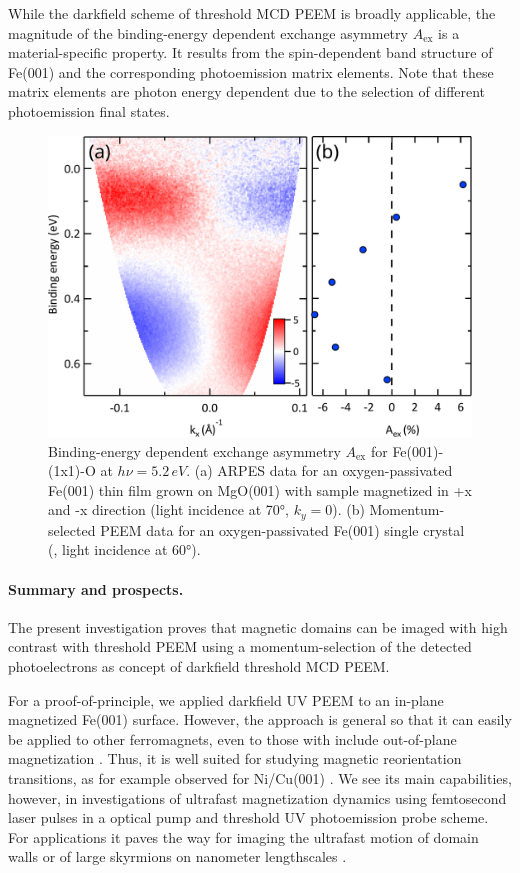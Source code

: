 \documentclass[prl,twocolumn,floatfix]{revtex4-2}
\newcommand{\rework}[1]{{\color{blue}{#1}}}
\begin{document}
While the darkfield scheme of threshold MCD PEEM is broadly applicable, the magnitude of the binding-energy dependent exchange asymmetry $A_{\mathrm{ex}}$ is a material-specific property. It results from the spin-dependent band structure of Fe(001) and the corresponding photoemission matrix elements. Note that these matrix elements are photon energy dependent due to the selection of different photoemission final states.

\begin{figure}
    \centering
    \includegraphics[width = 0.9\columnwidth]{Fe001-O_2.pdf}
    \caption{Binding-energy dependent exchange asymmetry $A_{\mathrm{ex}}$ for Fe(001)-(1x1)-O at $h\nu = 5.2\,eV$. (a) ARPES data for an oxygen-passivated Fe(001) thin film grown on MgO(001) with sample magnetized in +x and -x direction (light incidence at 70°, $k_y = 0$). (b) Momentum-selected PEEM data for an oxygen-passivated Fe(001) single crystal (\rework{selection at $k_x = \unit[xx]{\AA}$, $k_y = 0$}, light incidence at 60°). 
    }
    \label{fig:AexContrast}
\end{figure}

\paragraph{Summary and prospects.} The present investigation proves that magnetic domains can be imaged with high contrast with threshold PEEM using a momentum-selection of the detected photoelectrons as concept of darkfield threshold MCD PEEM. 

For a proof-of-principle, we applied darkfield UV PEEM to an in-plane magnetized Fe(001) surface. However, the approach is general so that it can easily be applied to other ferromagnets, even to those with include out-of-plane magnetization \cite{kronseder2011}. Thus, it is well suited for studying magnetic reorientation transitions, as for example observed for Ni/Cu(001) \cite{fukumoto2002,sander2004,nakagawa2006,kronseder2011}. We see its main capabilities, however, in investigations of ultrafast magnetization dynamics using femtosecond laser pulses in a optical pump and threshold UV photoemission probe scheme. For applications it paves the way for imaging the ultrafast motion of domain walls \cite{parkin2008} or of large skyrmions on nanometer lengthscales \cite{goebel2019,jani2021,kern2022}.
\end{document}
